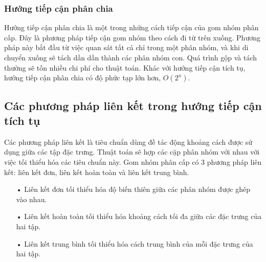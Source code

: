	
	\subsubsection{Hướng tiếp cận phân chia}
		Hướng tiếp cận phân chia là một trong những cách tiếp cận của gom nhóm phân cấp.
		Đây là phương pháp tiếp cận gom nhóm theo cách đi từ trên xuống.
		Phương pháp này bắt đầu từ việc quan sát tất cả chỉ trong một phân nhóm, và khi di chuyển xuống sẽ tách dần dần thành các phân nhóm con.
		Quá trình gộp và tách thường sẽ tốn nhiều chi phí cho thuật toán.
		Khác với hướng tiếp cận tích tụ, hướng tiếp cận phân chia có độ phức tạp lớn hơn, $O(2^n)$.
		
		

\subsection{Các phương pháp liên kết trong hướng tiếp cận tích tụ}
Các phương pháp liên kết là tiêu chuẩn dùng đề tác động khoảng cách được sử dụng giữa các tập đặc trưng.
Thuật toán sẽ hợp các cặp phân nhóm với nhau với việc tối thiểu hóa các tiêu chuẩn này.
Gom nhóm phân cấp có 3 phương pháp liên kết: liên kết đơn, liên kết hoàn toàn và liên kết trung bình.
\begin{enumerate}
\item[•]Liên kết đơn tối thiểu hóa độ biến thiên giữa các phân nhóm được ghép vào nhau.
\item[•]Liên kết hoàn toàn tối thiểu hóa khoảng cách tối đa giữa các đặc trưng của hai tập.
\item[•]Liên kết trung bình tối thiểu hóa cách trung bình của mỗi đặc trưng của hai tập.
\end{enumerate}
 
